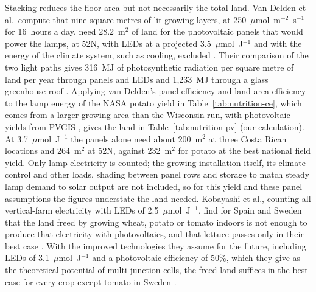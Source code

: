 Stacking reduces the floor area but not necessarily the total land. Van Delden et al.\ compute that nine square metres of lit growing layers, at 250~$\mu$mol~m$^{-2}$~s$^{-1}$ for 16~hours a day, need 28.2~m$^2$ of land for the photovoltaic panels that would power the lamps, at 52\textdegree{}N, with LEDs at a projected 3.5~$\mu$mol~J$^{-1}$ and with the energy of the climate system, such as cooling, excluded \cite[Fig.~4c and caption, p.~952]{vandelden2021vf}. Their comparison of the two light paths gives 316~MJ of photosynthetic radiation per square metre of land per year through panels and LEDs and 1{,}233~MJ through a glass greenhouse roof \cite[Fig.~4a--b, p.~952]{vandelden2021vf}. Applying van Delden's panel efficiency and land-area efficiency to the lamp energy of the NASA potato yield in Table~\ref{tab:nutrition-ce}, which comes from a larger growing area than the Wisconsin run, with photovoltaic yields from PVGIS \cite{jrc2026pvgis}, gives the land in Table~\ref{tab:nutrition-pv} (our calculation). At 3.7~$\mu$mol~J$^{-1}$ the panels alone need about 200~m$^2$ at three Costa Rican locations and 264~m$^2$ at 52\textdegree{}N, against 232~m$^2$ for potato at the best national field yield. Only lamp electricity is counted; the growing installation itself, its climate control and other loads, shading between panel rows and storage to match steady lamp demand to solar output are not included, so for this yield and these panel assumptions the figures understate the land needed. Kobayashi et al., counting all vertical-farm electricity with LEDs of 2.5~$\mu$mol~J$^{-1}$, find for Spain and Sweden that the land freed by growing wheat, potato or tomato indoors is not enough to produce that electricity with photovoltaics, and that lettuce passes only in their best case \cite[Abstract; Section~2.5, p.~3; Section~3.1.2 and Table~3, p.~4]{kobayashi2022vf}. With the improved technologies they assume for the future, including LEDs of 3.1~$\mu$mol~J$^{-1}$ and a photovoltaic efficiency of 50\%, which they give as the theoretical potential of multi-junction cells, the freed land suffices in the best case for every crop except tomato in Sweden \cite[Abstract; Section~2.5, p.~3; Table~4, p.~5; Section~3.2.3, p.~6]{kobayashi2022vf}.%



